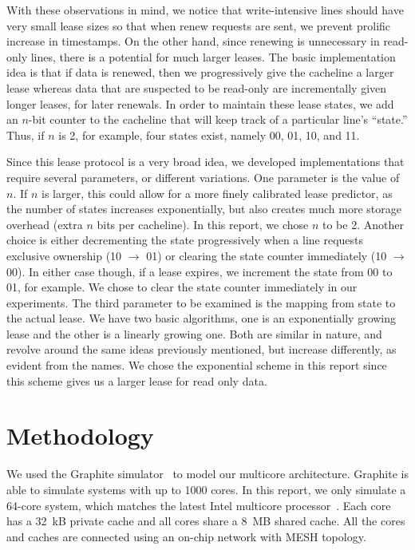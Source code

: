 \documentclass[12pt]{article}
\begin{document}
With these observations in mind, we notice that write-intensive lines 
should have very small lease sizes so that when renew requests are 
sent, we prevent prolific increase in timestamps. On the other hand, 
since renewing is unnecessary in read-only lines, there is a potential 
for much larger leases. The basic implementation idea is that if data
is renewed, then we progressively give the cacheline a larger lease 
whereas data that are suspected to be read-only are incrementally 
given longer leases, for later renewals. In order to maintain these 
lease states, we add an $n$-bit counter to the cacheline that will 
keep track of a particular line's “state.” Thus, if $n$ is 2, for 
example, four states exist, namely 00, 01, 10, and 11. 

Since this lease protocol is a very broad idea, we developed 
implementations that require several parameters, or different  %
variations. One parameter is the value of $n$. If $n$ is larger, this 
could allow for a more finely calibrated lease predictor, as the number of %
states increases exponentially, but also creates much more storage 
overhead (extra $n$ bits per cacheline). In this report, we chose $n$ 
to be 2. Another choice is either decrementing the state progressively 
when a line requests exclusive ownership (10 $\rightarrow$ 01) or 
clearing the state counter immediately (10 $\rightarrow$ 00). In 
either case though, if a lease expires, we increment the state from 00 
to 01, for example. We chose to clear the state counter immediately in 
our experiments. The third parameter to be examined is the mapping 
from state to the actual lease. We have two basic algorithms, one is 
an exponentially growing lease and the other is a linearly growing 
one.  Both are similar in nature, and revolve around the same ideas 
previously mentioned, but increase differently, as evident from the 
names. We chose the exponential scheme in this report since this 
scheme gives us a larger lease for read only data.

\section{Methodology}

We used the Graphite simulator~\cite{graphite} to model our multicore 
architecture. Graphite is able to simulate 
systems with up to 1000 cores. In this report, we only simulate a 
64-core system, which matches the latest Intel multicore 
processor~\cite{xeonphi}. Each core has a 32~kB private cache and all 
cores share a 8~MB shared cache. All the cores and caches are 
connected using an on-chip network with MESH topology.
\end{document}

